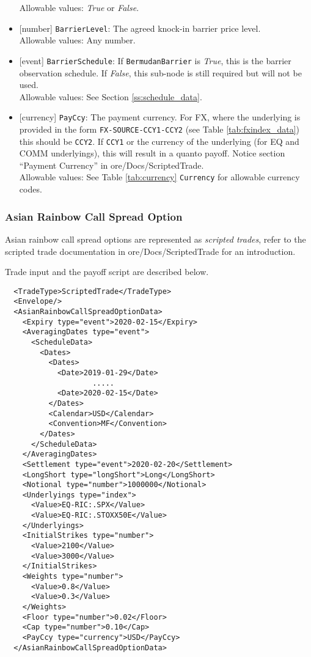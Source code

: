 \begin{itemize}
  Allowable values: \emph{True} or \emph{False}.
  \item{}[number] \lstinline!BarrierLevel!: The agreed knock-in barrier price level. \\
  Allowable values: Any number.
  \item{}[event] \lstinline!BarrierSchedule!: If \lstinline!BermudanBarrier! is \emph{True}, this is the barrier observation
  schedule. If \emph{False}, this sub-node is still required but will not be used. \\
  Allowable values: See Section \ref{ss:schedule_data}.
  \item{}[currency] \lstinline!PayCcy!: The payment currency. For FX, where the underlying is provided
      in the form \lstinline!FX-SOURCE-CCY1-CCY2! (see Table \ref{tab:fxindex_data}) this should
      be \lstinline!CCY2!. If \lstinline!CCY1! or the currency of the underlying (for EQ and
      COMM underlyings), this will result in a quanto payoff. Notice section ``Payment Currency'' in ore/Docs/ScriptedTrade. \\
        Allowable values: See Table \ref{tab:currency} \lstinline!Currency! for allowable currency codes.
\end{itemize}

\subsubsection*{Asian Rainbow Call Spread Option}

Asian rainbow call spread options are represented as {\em scripted trades}, refer to the scripted trade documentation in ore/Docs/ScriptedTrade
for an introduction.

Trade input and the payoff script are described below.

\begin{verbatim}
  <TradeType>ScriptedTrade</TradeType>
  <Envelope/>
  <AsianRainbowCallSpreadOptionData>
    <Expiry type="event">2020-02-15</Expiry>
    <AveragingDates type="event">
      <ScheduleData>
        <Dates>
          <Dates>
            <Date>2019-01-29</Date>
                    .....
            <Date>2020-02-15</Date>
          </Dates>
          <Calendar>USD</Calendar>
          <Convention>MF</Convention>
        </Dates>
      </ScheduleData>
    </AveragingDates>
    <Settlement type="event">2020-02-20</Settlement>
    <LongShort type="longShort">Long</LongShort>
    <Notional type="number">1000000</Notional>
    <Underlyings type="index">
      <Value>EQ-RIC:.SPX</Value>
      <Value>EQ-RIC:.STOXX50E</Value>
    </Underlyings>
    <InitialStrikes type="number">
      <Value>2100</Value>
      <Value>3000</Value>
    </InitialStrikes>
    <Weights type="number">
      <Value>0.8</Value>
      <Value>0.3</Value>
    </Weights>
    <Floor type="number">0.02</Floor>
    <Cap type="number">0.10</Cap>
    <PayCcy type="currency">USD</PayCcy>
  </AsianRainbowCallSpreadOptionData>
\end{verbatim}

